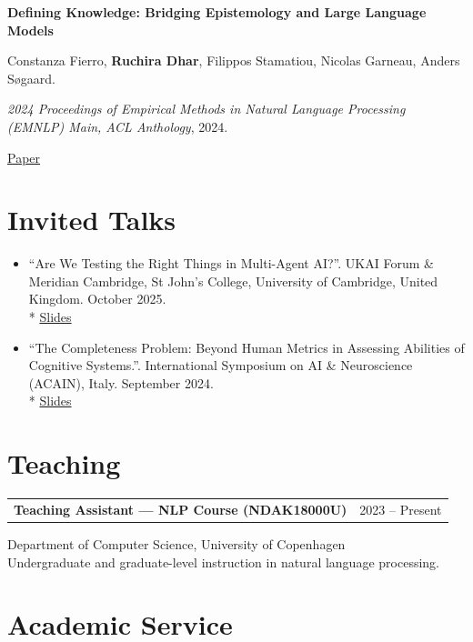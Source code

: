\documentclass[11pt,letterpaper]{article}
\makeatletter
\newcommand{\entry}[2]{%
  \par\addvspace{7pt}\Needspace{5\baselineskip}%
  \noindent\begin{tabularx}{\linewidth}{@{}Xr@{}}%
    \textbf{#1} & {\small\sffamily\color{muted}#2}%
  \end{tabularx}\par\nobreak\vspace{-3pt}%
}
\newcommand{\publication}[4]{%
  \par\addvspace{7pt}\Needspace{6\baselineskip}%
  \begin{samepage}%
    \setlength{\parskip}{1.5pt}%
    \noindent\textbf{#1}\par\nobreak
    {\small #2\par}\nobreak
    {\small\color{muted}#3\par}\nobreak
    {\footnotesize\sffamily #4\par}%
  \end{samepage}%
}
\makeatother
\begin{document}
\publication
  {Defining Knowledge: Bridging Epistemology and Large Language Models}
  {Constanza Fierro, \textbf{Ruchira Dhar}, Filippos Stamatiou, Nicolas Garneau, Anders S\o{}gaard.}
  {\textit{2024 Proceedings of Empirical Methods in Natural Language Processing (EMNLP) Main, ACL Anthology}, 2024.}
  {\href{https://aclanthology.org/2024.emnlp-main.900/}{Paper}}


\section{Invited Talks}

\begin{itemize}[label={}, leftmargin=0pt, labelsep=0pt]

  \item ``Are We Testing the Right Things in Multi-Agent AI?''.
    UKAI Forum \& Meridian Cambridge, St John's College,
    University of Cambridge, United Kingdom. October 2025.\\*
    {\footnotesize\sffamily\href{https://docs.google.com/presentation/d/1KIEEOPm9NBGmvGGng7yyONUNGWJDw2m42DNWNqcwdZM/edit?usp=sharing}{Slides}}

  \item ``The Completeness Problem: Beyond Human Metrics in Assessing Abilities of Cognitive Systems.''.
    International Symposium on AI \& Neuroscience (ACAIN),
    Italy. September 2024.\\*
    {\footnotesize\sffamily\href{https://docs.google.com/presentation/d/1Rm3fg9-OIM6Gj81y7WALZiOIGLdwvzXw9mKZCwlKcD4/edit?usp=sharing}{Slides}}

\end{itemize}

\section{Teaching}

\entry{Teaching Assistant --- NLP Course (NDAK18000U)}{2023 -- Present}
Department of Computer Science, University of Copenhagen\\
Undergraduate and graduate-level instruction in natural language processing.

\section{Academic Service}
\end{document}
